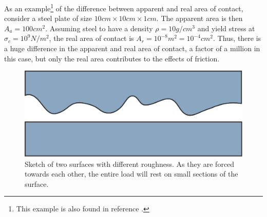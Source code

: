 \documentclass[twoside,english]{uiofysmaster}
\begin{document}
As an example\footnote{This example is also found in reference \cite{Introduction2Friction}. } of the difference between apparent and real area of contact, consider a steel plate of size $10cm\times10cm\times1cm$. The apparent area is then $A_a=100cm^2$. Assuming steel to have a density $\rho=10g/cm^3$ and yield stress at $\sigma_c=10^9N/m^2$, the real area of contact is $A_r = 10^{-8}m^2 = 10^{-4}cm^2$.
Thus, there is a huge difference in the apparent and real area of contact, a factor of a million in this case, but only the real area contributes to the effects of friction. 

\begin{figure}
		\centering
		\includegraphics[width=0.5\linewidth]{figures/friction/areaOfContact/apart.pdf}
		\caption{Sketch of two surfaces with different roughness. As they are forced towards each other, the entire load will rest on small sections of the surface.}
		\label{fig:realAreaOfContact0}
\end{figure}



\end{document}
